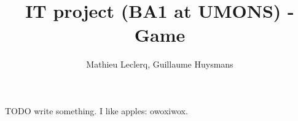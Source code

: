 \documentclass[12pt]{article}
\title{IT project (BA1 at UMONS) - Game}
\author{Mathieu Leclerq, Guillaume Huysmans}
\begin{document}
\maketitle


TODO write something. I like apples: owoxiwox.
%
\end{document}

